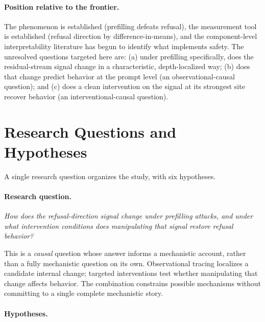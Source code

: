 \documentclass{article}
\begin{document}
\paragraph{Position relative to the frontier.}
The phenomenon is established (prefilling defeats refusal), the measurement
tool is established (refusal direction by difference-in-means), and the
component-level interpretability literature has begun to identify what
implements safety. The unresolved questions targeted here are: (a) under
prefilling specifically, does the residual-stream signal change in a
characteristic, depth-localized way; (b) does that change predict behavior
at the prompt level (an observational-causal question); and (c) does a
clean intervention on the signal at its strongest site recover behavior
(an interventional-causal question).

\section{Research Questions and Hypotheses}
\label{sec:rqs}

A single research question organizes the study, with six hypotheses.

\paragraph{Research question.}
\emph{How does the refusal-direction signal change under prefilling
attacks, and under what intervention conditions does manipulating that
signal restore refusal behavior?}

This is a \emph{causal} question whose answer informs a mechanistic
account, rather than a fully mechanistic question on its own.
Observational tracing
localizes a candidate internal change; targeted interventions test
whether manipulating that change affects behavior. The combination
constrains possible mechanisms without committing to a single complete
mechanistic story.

\paragraph{Hypotheses.}
\end{document}
